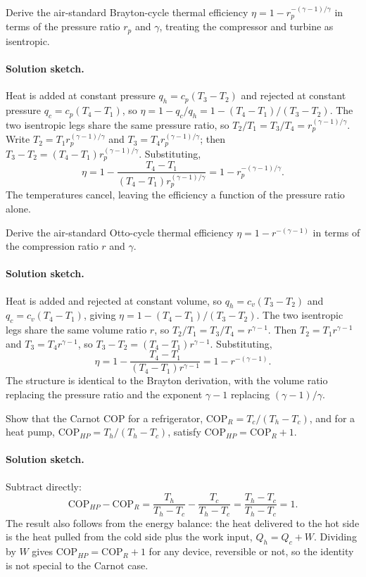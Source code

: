 \begin{exercise}
Derive the air-standard Brayton-cycle thermal efficiency $\eta = 1 -
r_p^{-(\gamma-1)/\gamma}$ in terms of the pressure ratio $r_p$ and
$\gamma$, treating the compressor and turbine as isentropic.

\paragraph{Solution sketch.} Heat is added at constant pressure $q_h =
c_p(T_3 - T_2)$ and rejected at constant pressure $q_c = c_p(T_4 -
T_1)$, so $\eta = 1 - q_c/q_h = 1 - (T_4 - T_1)/(T_3 - T_2)$. The two
isentropic legs share the same pressure ratio, so $T_2/T_1 = T_3/T_4 =
r_p^{(\gamma-1)/\gamma}$. Write $T_2 = T_1 r_p^{(\gamma-1)/\gamma}$ and
$T_3 = T_4 r_p^{(\gamma-1)/\gamma}$; then $T_3 - T_2 = (T_4 -
T_1)r_p^{(\gamma-1)/\gamma}$. Substituting,
\[
\eta = 1 - \frac{T_4 - T_1}{(T_4 - T_1)r_p^{(\gamma-1)/\gamma}}
= 1 - r_p^{-(\gamma-1)/\gamma}.
\]
The temperatures cancel, leaving the efficiency a function of the
pressure ratio alone.
\end{exercise}

\begin{exercise}
Derive the air-standard Otto-cycle thermal efficiency $\eta = 1 -
r^{-(\gamma-1)}$ in terms of the compression ratio $r$ and $\gamma$.

\paragraph{Solution sketch.} Heat is added and rejected at constant
volume, so $q_h = c_v(T_3 - T_2)$ and $q_c = c_v(T_4 - T_1)$, giving
$\eta = 1 - (T_4 - T_1)/(T_3 - T_2)$. The two isentropic legs share the
same volume ratio $r$, so $T_2/T_1 = T_3/T_4 = r^{\gamma-1}$. Then $T_2 =
T_1 r^{\gamma-1}$ and $T_3 = T_4 r^{\gamma-1}$, so $T_3 - T_2 = (T_4 -
T_1)r^{\gamma-1}$. Substituting,
\[
\eta = 1 - \frac{T_4 - T_1}{(T_4 - T_1)r^{\gamma-1}}
= 1 - r^{-(\gamma-1)}.
\]
The structure is identical to the Brayton derivation, with the volume
ratio replacing the pressure ratio and the exponent $\gamma - 1$
replacing $(\gamma-1)/\gamma$.
\end{exercise}

\begin{exercise}
Show that the Carnot COP for a refrigerator, $\text{COP}_R = T_c/(T_h
- T_c)$, and for a heat pump, $\text{COP}_{HP} = T_h/(T_h - T_c)$,
satisfy $\text{COP}_{HP} = \text{COP}_R + 1$.

\paragraph{Solution sketch.} Subtract directly:
\[
\text{COP}_{HP} - \text{COP}_R = \frac{T_h}{T_h - T_c} -
\frac{T_c}{T_h - T_c} = \frac{T_h - T_c}{T_h - T_c} = 1.
\]
The result also follows from the energy balance: the heat delivered to
the hot side is the heat pulled from the cold side plus the work input,
$Q_h = Q_c + W$. Dividing by $W$ gives $\text{COP}_{HP} = \text{COP}_R +
1$ for any device, reversible or not, so the identity is not special to
the Carnot case.
\end{exercise}

